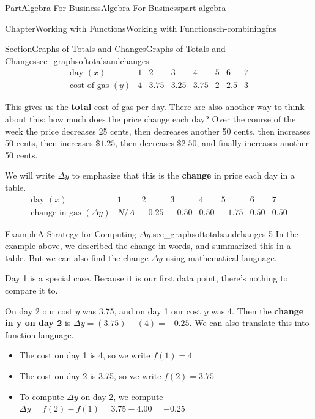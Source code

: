 \documentclass{tufte-book}
\newcommand{\terminology}[1]{\textbf{#1}}
\numberwithin{equation}{chapter}
\begin{document}
\begin{partptx}{Part}{Algebra For Business}{}{Algebra For Business}{}{}{part-algebra}
\begin{chapterptx}{Chapter}{Working with Functions}{}{Working with Functions}{}{}{ch-combiningfns}
\begin{sectionptx}{Section}{\textasteriskcentered{}Graphs of Totals and Changes}{}{\textasteriskcentered{}Graphs of Totals and Changes}{}{}{sec_graphsoftotalsandchanges}
\begin{equation*}
\begin{array}{c|c|c|c|c|c|c|c}
\text{day }(x)         
&  1 
&  2   
&  3  
&  4  
&  5 
&  6 
&  7  
\\ \hline
\text{cost of gas }(y) 
& 4  
& 3.75
& 3.25
& 3.75
& 2  
& 2.5
& 3
\end{array}
\end{equation*}
%
\par
This gives us the \terminology{total} cost of gas per day. There are also another way to think about this: how much does the price change each day? Over the course of the week the price decreases 25 cents, then decreases another 50 cents, then increases 50 cents, then increases \(\$1.25\), then decreases \(\$2.50\), and finally increases another 50 cents.%
\par
We will write \(\Delta y\) to emphasize that this is the \terminology{change} in price each day in a table.%
\begin{equation*}
\begin{array}{c|c|c|c|c|c|c|c}
\text{day }(x)
&  1 
&  2   
&  3  
&  4  
&  5 
&  6 
&  7  
\\ \hline
\text{change in gas }(\Delta y) 
& N/A  
& -0.25 
& -0.50 
&  0.50 
& -1.75 
&  0.50 
&  0.50
\end{array}
\end{equation*}
%
\begin{example}{Example}{A Strategy for Computing \(\Delta y\).}{sec_graphsoftotalsandchanges-5}%
In the example above, we described the change in words, and summarized this in a table. But we can also find the change \(\Delta y\) using mathematical language.%
\par
Day 1 is a special case. Because it is our first data point, there's nothing to compare it to.%
\par
On day 2 our cost \(y\) was 3.75, and on day 1 our cost \(y\) was 4. Then the \terminology{change in y on day 2} is \(\Delta y = (3.75) - (4) = -0.25\). We can also translate this into function language.%
\begin{itemize}[label=\textbullet]
\item{}The cost on day 1 is \textdollar{}4, so we write \(f(1) = 4\)%
\item{}The cost on day 2 is \textdollar{}3.75, so we write \(f(2) = 3.75\)%
\item{}To compute \(\Delta y\) on day 2, we compute \(\Delta y = f(2)-f(1) = 3.75-4.00=-0.25\)%
\end{itemize}

\end{example}
\end{sectionptx}
\end{chapterptx}
\end{partptx}
\end{document}
